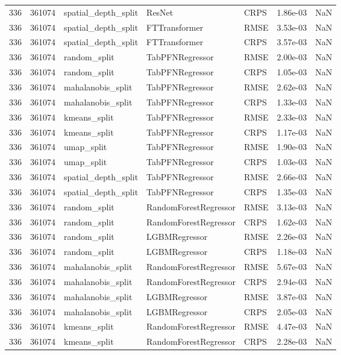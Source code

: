 \begin{tabular}{rrlllrr}
336 & 361074 & spatial\_depth\_split & ResNet & CRPS & 1.86e-03 & NaN \\
336 & 361074 & spatial\_depth\_split & FTTransformer & RMSE & 3.53e-03 & NaN \\
336 & 361074 & spatial\_depth\_split & FTTransformer & CRPS & 3.57e-03 & NaN \\
336 & 361074 & random\_split & TabPFNRegressor & RMSE & 2.00e-03 & NaN \\
336 & 361074 & random\_split & TabPFNRegressor & CRPS & 1.05e-03 & NaN \\
336 & 361074 & mahalanobis\_split & TabPFNRegressor & RMSE & 2.62e-03 & NaN \\
336 & 361074 & mahalanobis\_split & TabPFNRegressor & CRPS & 1.33e-03 & NaN \\
336 & 361074 & kmeans\_split & TabPFNRegressor & RMSE & 2.33e-03 & NaN \\
336 & 361074 & kmeans\_split & TabPFNRegressor & CRPS & 1.17e-03 & NaN \\
336 & 361074 & umap\_split & TabPFNRegressor & RMSE & 1.90e-03 & NaN \\
336 & 361074 & umap\_split & TabPFNRegressor & CRPS & 1.03e-03 & NaN \\
336 & 361074 & spatial\_depth\_split & TabPFNRegressor & RMSE & 2.66e-03 & NaN \\
336 & 361074 & spatial\_depth\_split & TabPFNRegressor & CRPS & 1.35e-03 & NaN \\
336 & 361074 & random\_split & RandomForestRegressor & RMSE & 3.13e-03 & NaN \\
336 & 361074 & random\_split & RandomForestRegressor & CRPS & 1.62e-03 & NaN \\
336 & 361074 & random\_split & LGBMRegressor & RMSE & 2.26e-03 & NaN \\
336 & 361074 & random\_split & LGBMRegressor & CRPS & 1.18e-03 & NaN \\
336 & 361074 & mahalanobis\_split & RandomForestRegressor & RMSE & 5.67e-03 & NaN \\
336 & 361074 & mahalanobis\_split & RandomForestRegressor & CRPS & 2.94e-03 & NaN \\
336 & 361074 & mahalanobis\_split & LGBMRegressor & RMSE & 3.87e-03 & NaN \\
336 & 361074 & mahalanobis\_split & LGBMRegressor & CRPS & 2.05e-03 & NaN \\
336 & 361074 & kmeans\_split & RandomForestRegressor & RMSE & 4.47e-03 & NaN \\
336 & 361074 & kmeans\_split & RandomForestRegressor & CRPS & 2.28e-03 & NaN \\

\end{tabular}
